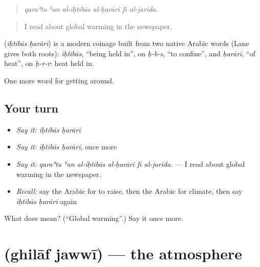 \begin{quote}
\emph{qaraʾtu ʿan al-iḥtibās al-ḥarārī fī al-jarīda.}
\end{quote}

\begin{quote}
I read about global warming in the newspaper.
\end{quote}

\begin{cousinweb}
\textbf{ } (\emph{iḥtibās ḥarārī}) is a modern coinage built from two native Arabic words (Lane gives both roots): \emph{iḥtibās}, \textquotedblleft{}being held in\textquotedblright{}, on \emph{ḥ-b-s}, \textquotedblleft{}to confine\textquotedblright{}, and \emph{ḥarārī}, \textquotedblleft{}of heat\textquotedblright{}, on \emph{ḥ-r-r}: heat held in.
\end{cousinweb}

\begin{grammarlens}[title={What you've built}]
One more word for getting around.
\end{grammarlens}

\subsection*{Your turn}
\begin{itemize}
\raggedright
  \item \emph{Say it:} \emph{iḥtibās ḥarārī}
  \item \emph{Say it:} \emph{iḥtibās ḥarārī}, once more
  \item \emph{Say it:} \emph{qaraʾtu ʿan al-iḥtibās al-ḥarārī fī al-jarīda.} — I read about global warming in the newspaper.
  \item \emph{Recall:} say the Arabic for to raise, then the Arabic for climate, then say \emph{iḥtibās ḥarārī} again
\end{itemize}

\begin{tcolorbox}[breakable,colback=teal!4,colframe=teal!35!black,title={Before you move on}]
What does   mean? (\textquotedblleft{}Global warming\textquotedblright{}.) Say it once more.
\end{tcolorbox}
\section[\texorpdfstring{\ar{غلاف} \ar{جوي} (ghilāf jawwī)}{غلاف جوي (ghilāf jawwī)}]{  (ghilāf jawwī) — the atmosphere}

